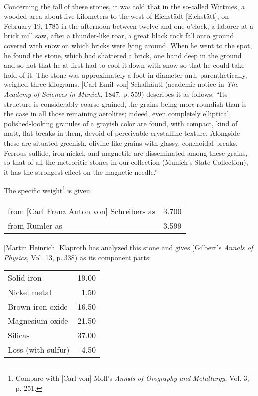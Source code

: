 \documentclass[a4paper, 12pt, oneside]{article}
\begin{document}
\paragraph*{}
Concerning the fall of these stones, it was told that in the so-called Wittmes, a wooded area about five kilometers to the west of Eichstädt [Eichstätt], on February 19, 1785 in the afternoon between twelve and one o'clock, a laborer at a brick mill saw, after a thunder-like roar, a great black rock fall onto ground covered with snow on which bricks were lying around. When he went to the spot, he found the stone, which had shattered a brick, one hand deep in the ground and so hot that he at first had to cool it down with snow so that he could take hold of it. The stone was approximately a foot in diameter and, parenthetically, weighed three kilograms. [Carl Emil von] Schafhäutl (academic notice in \emph{The Academy of Sciences in Munich}, 1847, p. 559) describes it as follows: ``Its structure is considerably coarse-grained, the grains being more roundish than is the case in all those remaining aerolites; indeed, even completely elliptical, polished-looking granules of a grayish color are found, with compact, kind of matt, flat breaks in them, devoid of perceivable crystalline texture. Alongside these are situated greenish, olivine-like grains with glassy, conchoidal breaks. Ferrous sulfide, iron-nickel, and magnetite are disseminated among these grains, so that of all the meteoritic stones in our collection (Munich's State Collection), it has the strongest effect on the magnetic needle.''

The specific weight\footnote{Compare with [Carl von] Moll's \emph{Annals of Orography and Metallurgy}, Vol. 3, p. 251.} is given:
\begin{center}
    \begin{tabular}{l r}
        from [Carl Franz Anton von] Schreibers as & 3.700\\
        from Rumler as & 3.599\\
    \end{tabular}
\end{center}
\paragraph*{}
[Martin Heinrich] Klaproth has analyzed this stone and gives (Gilbert's \emph{Annals of Physics}, Vol. 13, p. 338) as its component parts:
\begin{center}
    \begin{tabular}{l r}
        Solid iron & 19.00\\
        Nickel metal & 1.50\\
        Brown iron oxide & 16.50\\
        Magnesium oxide & 21.50\\
        Silicas & 37.00\\
        Loss (with sulfur) & 4.50\\
    \end{tabular}
\end{center}
\end{document}
